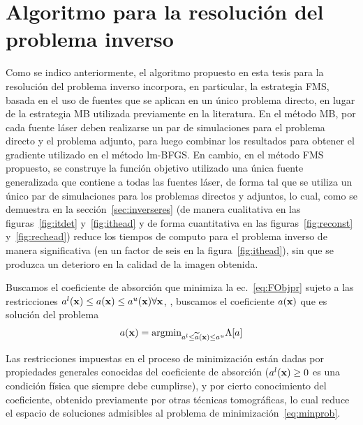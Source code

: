 \section{Algoritmo para la resolución del problema inverso}
\label{sec:inversesolv}

Como se indico anteriormente, el algoritmo propuesto en esta tesis para la resolución del 
problema inverso incorpora, en particular, la estrategia FMS, basada 
en el uso de fuentes que se aplican en un único problema directo, 
en lugar de la estrategia MB utilizada previamente en la literatura. 
En el método MB, por cada fuente láser deben realizarse un par 
de simulaciones para el problema directo y el problema adjunto, 
para luego combinar los resultados para obtener el gradiente utilizado 
en el método lm-BFGS. En cambio, en el método FMS propuesto, 
se construye la función objetivo utilizado una única fuente 
generalizada que contiene a todas las fuentes láser, de forma tal 
que se utiliza un único par de simulaciones para los problemas directos 
y adjuntos, lo cual, como se demuestra en la sección~\ref{sec:inverseres} 
(de manera cualitativa en las figuras~\ref{fig:itdet} y~\ref{fig:ithead} 
y de forma cuantitativa en las figuras~\ref{fig:reconst} y~\ref{fig:rechead}) 
reduce los tiempos de computo para el problema inverso de manera significativa 
(\eg en un factor de seis en la figura~\ref{fig:ithead}), sin que se 
produzca un deterioro en la calidad de la imagen obtenida. 

Buscamos el coeficiente de absorción que minimiza la ec.~\eqref{eq:FObjpr}  
sujeto a las restricciones $a^l(\mathbf{x}) \leq a(\mathbf{x}) \leq a^u(\mathbf{x}) \forall \mathbf{x}$, \ie, buscamos 
el coeficiente $a(\mathbf{x})$ que es solución del problema 
\begin{equation}
\begin{split}
\begin{aligned}
a(\mathbf{x})=\text{argmin}_{a^l \leq \widetilde a(\mathbf{x}) \leq a^u} \Lambda[a]
\end{aligned}
\end{split}
\label{eq:minprob}
\end{equation}

Las restricciones impuestas en el proceso de minimización están dadas 
por propiedades generales conocidas del coeficiente de absorción ($a^l(\mathbf{x})\ge 0$ 
es una condición física que siempre debe cumplirse), y por cierto conocimiento 
del coeficiente, obtenido previamente por otras técnicas tomográficas, lo 
cual reduce el espacio de soluciones admisibles al problema de minimización~\eqref{eq:minprob}.

